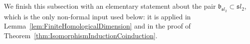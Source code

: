 \documentclass[10pt]{amsart}
\newtheorem{definition}[theorem]{Definition}
\newcommand{\fg}{{\mathfrak g}}
\newcommand{\fsl}{{\mathfrak sl}}
\newcommand{\fb}{{\mathfrak b}}
\DeclareMathOperator{\Res}{Res}
\DeclareMathOperator{\Ind}{Ind}
\DeclareMathOperator{\coInd}{coInd}
\begin{document}
	
	
	
	
	We finish this subsection with an elementary statement about the pair $\fb_{\fsl_2}\subset \fsl_2$, which is the only non-formal input used below: it is applied in Lemma~\ref{lem:FiniteHomologicalDimension} and in the proof of Theorem~\ref{thm:IsomorphismInductionCoinduction}.
	
\end{document}
